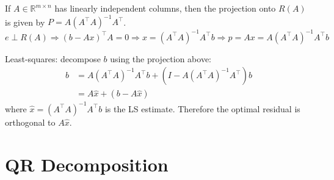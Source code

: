 \documentclass[14pt]{article}
\theoremstyle{definition}
\theoremstyle{remark}
\begin{document}
\begin{multicols}{2}
    If $A \in \mathbb{R}^{m \times n}$ has linearly independent columns, then the projection onto $R(A)$ is given by $P=A\left(A^{\top} A\right)^{-1} A^{\top}$.
    \[e\perp R(A) \Longrightarrow (b-Ax)^\top A = 0 \Longrightarrow x = \left(A^{\top} A\right)^{-1} A^{\top} b \Longrightarrow p = Ax = A\left(A^{\top} A\right)^{-1} A^{\top}b\]

    Least-squares: decompose $b$ using the projection above:
    $$
        \begin{aligned}
            b & =A\left(A^{\top} A\right)^{-1} A^{\top} b+\left(I-A\left(A^{\top} A\right)^{-1} A^{\top}\right) b \\
              & =A \hat{x}+(b-A \hat{x})
        \end{aligned}
    $$
    where $\hat{x}=\left(A^{\top} A\right)^{-1} A^{\top} b$ is the LS estimate. Therefore the optimal residual is orthogonal to $A \hat{x}$.


\end{multicols}

\headrule

\section{QR Decomposition}



\headrule
\end{document}
